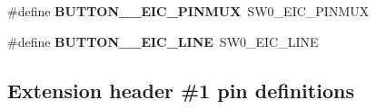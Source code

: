 \begin{DoxyCompactItemize}
\item 
\hypertarget{group__saml21__xplained__pro__features__group_gaca27ba0c8056196203f06d40cdeb7854}{}\#define {\bfseries B\+U\+T\+T\+O\+N\+\_\+\_\+\+E\+I\+C\+\_\+\+P\+I\+N\+M\+U\+X}~S\+W0\+\_\+\+E\+I\+C\+\_\+\+P\+I\+N\+M\+U\+X\label{group__saml21__xplained__pro__features__group_gaca27ba0c8056196203f06d40cdeb7854}

\item 
\hypertarget{group__saml21__xplained__pro__features__group_ga99e3515a27c1a4c1e44e04206c4a1a2c}{}\#define {\bfseries B\+U\+T\+T\+O\+N\+\_\+\_\+\+E\+I\+C\+\_\+\+L\+I\+N\+E}~S\+W0\+\_\+\+E\+I\+C\+\_\+\+L\+I\+N\+E\label{group__saml21__xplained__pro__features__group_ga99e3515a27c1a4c1e44e04206c4a1a2c}

\end{DoxyCompactItemize}
\subsection*{Extension header \#1 pin definitions}
